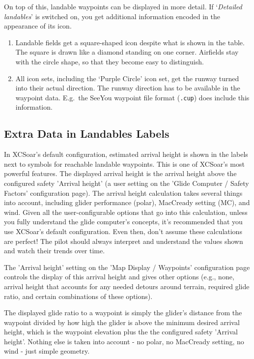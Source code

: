 On top of this, landable waypoints can be displayed in more detail. If
`\emph{Detailed landables}' is switched on, you get additional information
encoded in the appearance of its icon.
\begin{enumerate}
\item  Landable fields get a square-shaped icon despite what is shown in the table.
  The square is drawn like a diamond standing on one corner. Airfields stay with the 
  circle shape, so that they become easy to distinguish.
\item  All icon sets, including the `Purple Circle' icon set, get the 
  runway turned into their actual direction. The runway direction has to be available in 
  the waypoint data. E.g.\ the SeeYou waypoint file format (\verb|.cup|) does
  include this information.  
\end{enumerate}

\subsection*{Extra Data in Landables Labels}
In XCSoar's default configuration, estimated arrival height is shown in the labels
next to symbols for reachable landable waypoints.
This is one of XCSoar's most powerful features.
The displayed arrival height is the arrival height above the
configured safety 'Arrival height'  (a user setting on
the 'Glide Computer / Safety Factors' configuration page).
The arrival height calculation takes several things into account, including
glider performance (polar), MacCready setting (MC), and wind.
Given all the user-configurable options that go into this calculation, unless you fully
understand the glide computer's concepts, it's recommended that you
\warning
use XCSoar's default configuration. Even then, don't assume
these calculations are perfect!
The pilot should always interpret and understand the values shown and watch their trends
over time.

The 'Arrival height' setting on the 'Map Display / Waypoints' configuration page
controls the display of this arrival height and gives other options (e.g., none,
arrival height that accounts for any needed detours around terrain, required glide ratio,
and certain combinations of these options).

The displayed glide ratio to a waypoint is simply the glider's distance
from the waypoint divided by how high the glider is above the minimum desired
arrival height, which is the waypoint elevation plus the
the configured safety 'Arrival height'.
Nothing else is taken into account - no polar, no MacCready
setting, no wind - just simple geometry.

